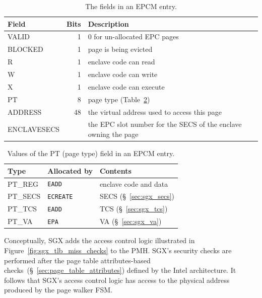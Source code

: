 \begin{table}[hbt]
  \centering
  \begin{tabularx}{\columnwidth}{| l | r | X |}
  \hline
  \textbf{Field} & \textbf{Bits} & \textbf{Description}\\
  \hline
  VALID & 1 & 0 for un-allocated EPC pages \\
  \hline
  BLOCKED & 1 & page is being evicted \\
  \hline
  R & 1 & enclave code can read \\
  \hline
  W & 1 & enclave code can write \\
  \hline
  X & 1 & enclave code can execute \\
  \hline
  PT & 8 & page type (Table~\ref{fig:sgx_pt_values}) \\
  \hline
  ADDRESS & 48 & the virtual address used to access this page \\
  \hline
  ENCLAVESECS &  & the EPC slot number for the SECS of the enclave owning the
                     page \\
  \hline
  \end{tabularx}
  \caption{
    The fields in an EPCM entry.
  }
  \label{fig:sgx_epcm_entry}
\end{table}

\begin{table}[hbt]
  \centering
  \begin{tabularx}{\columnwidth}{| l | l | X |}
  \hline
  \textbf{Type} & \textbf{Allocated by} & \textbf{Contents}\\
  \hline
  PT\_REG & \texttt{EADD} & enclave code and data \\
  \hline
  PT\_SECS & \texttt{ECREATE} & SECS (\S~\ref{sec:sgx_secs}) \\
  \hline
  PT\_TCS & \texttt{EADD} & TCS (\S~\ref{sec:sgx_tcs}) \\
  \hline
  PT\_VA & \texttt{EPA} & VA (\S~\ref{sec:sgx_va}) \\
  \hline
  \end{tabularx}
  \caption{Values of the PT (page type) field in an EPCM entry.}
  \label{fig:sgx_pt_values}
\end{table}


Conceptually, SGX adds the access control logic illustrated in
Figure~\ref{fig:sgx_tlb_miss_checks} to the PMH. SGX's security checks are
performed after the page table attributes-based
checks~(\S~\ref{sec:page_table_attributes}) defined by the Intel architecture.
It follows that SGX's access control logic has access to the physical address
produced by the page walker FSM.

